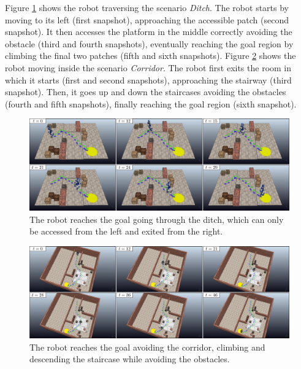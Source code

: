 Figure \ref{fig:WoS:offlineCase:Ditch:Snapshots} shows the robot traversing the scenario \textit{Ditch}. The robot starts by moving to its left (first snapshot), approaching the accessible patch (second snapshot). It then accesses the platform in the middle correctly avoiding the obstacle (third and fourth snapshots), eventually reaching the goal region by climbing the final two patches (fifth and sixth snapshots).
Figure \ref{fig:WoS:offlineCase:Corridor:Snapshots} shows the robot moving inside the scenario \textit{Corridor}. The robot first exits the room in which it starts (first and second snapshots), approaching the stairway (third snapshot). Then, it goes up and down the staircases avoiding the obstacles (fourth and fifth snapshots), finally reaching the goal region (sixth snapshot).

\begin{figure}
    \centering
    \includegraphics[width=\textwidth]{figures/OfflineDitch.png}
    \caption{The robot reaches the goal going through the ditch, which can only be accessed from the left and exited from the right.}
    \label{fig:WoS:offlineCase:Ditch:Snapshots}
\end{figure}
\begin{figure}
    \centering
    \includegraphics[width=\textwidth]{figures/OfflineCorridor.png}
    \caption{The robot reaches the goal avoiding the
    corridor, climbing and descending the staircase while
    avoiding the obstacles.}
    \label{fig:WoS:offlineCase:Corridor:Snapshots}
\end{figure}


